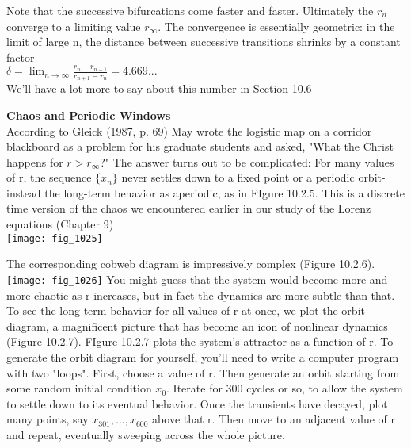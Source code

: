 \documentclass{article}
\newcommand\tab[1][1cm]{\hspace*{#1}}
\begin{document}
Note that the successive bifurcations come faster and faster. Ultimately the $r_{n}$ converge to a limiting value $r_{\infty}$. The convergence is essentially geometric: in the limit of large n, the distance between successive transitions shrinks by a constant factor \\ \tab \tab
$\delta = \lim_{n \to \infty} \frac{r_{n}-r_{n-1}}{r_{n+1}-r_{n}}=4.669...$ \\
We'll have a lot more to say about this number in Section 10.6 

\textbf {Chaos and Periodic Windows} \\ \tab
According to Gleick (1987, p. 69) May wrote the logistic map on a corridor blackboard as a problem for his graduate students and asked, "What the Christ happens for $r> r_{\infty}$?" The answer turns out to be complicated: For many values of r, the sequence $\{x_{n}\}$ never settles down to a fixed point or a periodic orbit-instead the long-term behavior as aperiodic, as in FIgure 10.2.5. This is a discrete time version of the chaos we encountered earlier in our study of the Lorenz equations (Chapter 9) \\

\texttt{[image: fig\_1025]}

The corresponding cobweb diagram is impressively complex (Figure 10.2.6).
\\
\texttt{[image: fig\_1026]}
\tab
You might guess that the system would become more and more chaotic as r increases, but in fact the dynamics are more subtle than that. To see the long-term behavior for all values of r at once, we plot the orbit diagram, a magnificent picture that has become an icon of nonlinear dynamics (Figure 10.2.7). FIgure 10.2.7 plots the system's attractor as a function of r. To generate the orbit diagram for yourself, you'll need to write a computer program with two "loops". First, choose a value of r. Then generate an orbit starting from some random initial condition $x_{0}$. Iterate for 300 cycles or so, to allow the system to settle down to its eventual behavior. Once the transients have decayed, plot many points, say $x_{301},...,x_{600}$ above that r. Then move to an adjacent value of r and repeat, eventually sweeping across the whole picture. \\ \tab
\end{document}

